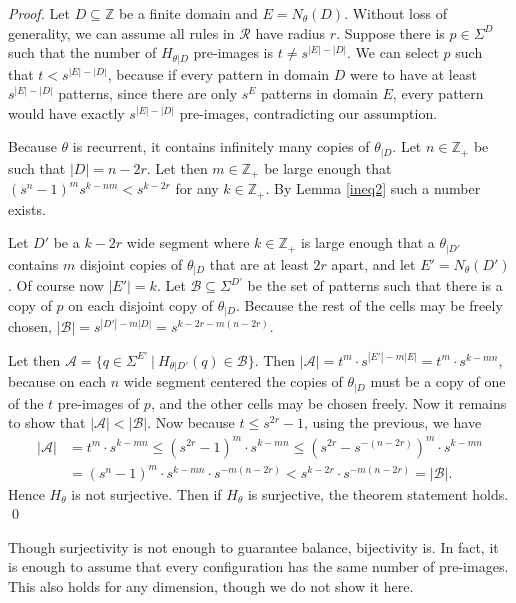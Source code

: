 \documentclass[runningheads]{llncs}
\newcommand{\Z}{\mathbb{Z}}
\newcommand{\R}{\mathcal{R}}
\newcommand{\set}[2]{\{ #1 \: | \: #2 \}}
\begin{document}
\begin{proof}
Let $D\subseteq \Z$ be a finite domain and $E=N_\theta (D)$. Without loss of generality, we can assume all rules in $\R$ have radius $r$. Suppose there is $p \in \Sigma^D$ such that the number of $H_{\theta|D}$ pre-images is $t\neq s^{|E|-|D|}$. We can select $p$ such that $t< s^{|E|-|D|}$, because if every pattern in domain $D$ were to have at least $s^{|E|-|D|}$ patterns, since there are only $s^E$ patterns in domain $E$, every pattern would have exactly $s^{|E|-|D|}$ pre-images, contradicting our assumption.

Because $\theta$ is recurrent, it contains infinitely many copies of $\theta_{|D}$. Let $n \in \Z_+$ be such that $|D|=n-2r$. Let then $m\in \Z_+$ be large enough that $(s^n-1)^m s^{k-nm}<s^{k-2r}$ for any $k\in \Z_+$. By Lemma \ref{ineq2} such a number exists.

Let $D'$ be a $k-2r$ wide segment where $k\in \Z_+$ is large enough that a $\theta_{|D'}$ contains $m$ disjoint copies of $\theta_{|D}$ that are at least $2r$ apart, and let $E'= N_\theta (D')$. Of course now $|E'|=k$. Let $\mathcal{B} \subseteq \Sigma^{D'}$ be the set of patterns such that there is a copy of $p$ on each disjoint copy of $\theta_{|D}$. Because the rest of the cells may be freely chosen, $|\mathcal{B}|=s^{|D'|-m|D|} = s^{k-2r-m(n-2r)}$.

Let then $\mathcal{A} = \set{q \in \Sigma^{E'}}{H_{\theta|D'}(q) \in \mathcal{B}}$. Then $|\mathcal{A}|=t^m \cdot s^{|E'|-m|E|} = t^m \cdot s^{k-mn}$, because on each $n$ wide segment centered the copies of $\theta_{|D}$ must be a copy of one of the $t$ pre-images of $p$, and the other cells may be chosen freely. Now it remains to show that $|\mathcal{A}| < |\mathcal{B}|$. Now because $t\leq s^{2r}-1$, using the previous, we have 
\begin{align*}
|\mathcal{A}| &= t^m \cdot s^{k-mn} \leq (s^{2r}-1)^m \cdot s^{k-mn}\leq (s^{2r}- s^{-(n-2r)})^m\cdot s^{k-mn}\\
&= (s^n - 1)^m  \cdot s^{k-mn} \cdot s^{-m(n-2r)} < s^{k-2r} \cdot s^{-m(n-2r)} = |\mathcal{B}|.
\end{align*}
Hence $H_\theta$ is not surjective. Then if $H_\theta$ is surjective, the theorem statement holds.
\qed
\end{proof}

Though surjectivity is not enough to guarantee balance, bijectivity is. In fact, it is enough to assume that every configuration has the same number of pre-images. This also holds for any dimension, though we do not show it here.
\end{document}
